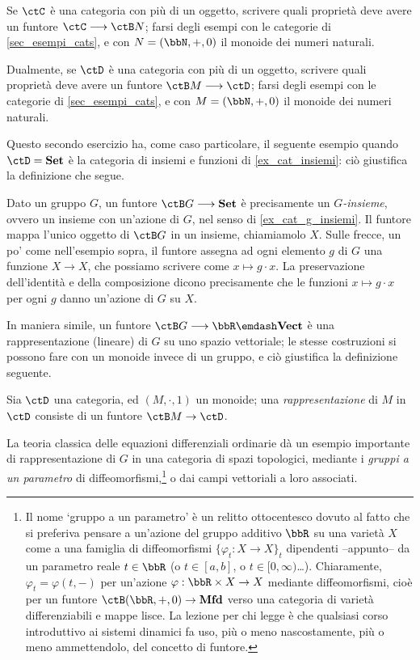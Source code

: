 Se \(\ctC\) è una categoria con più di un oggetto, scrivere quali proprietà deve avere un funtore \(\ctC \fun \ctB N\); farsi degli esempi con le categorie di \ref{sec_esempi_cats}, e con \(N=(\bbN,+,0)\) il monoide dei numeri naturali.

Dualmente, se \(\ctD\) è una categoria con più di un oggetto, scrivere quali proprietà deve avere un funtore \(\ctB M \fun \ctD\); farsi degli esempi con le categorie di \ref{sec_esempi_cats}, e con \(M = (\bbN,+,0)\) il monoide dei numeri naturali.

Questo secondo esercizio ha, come caso particolare, il seguente esempio quando \(\ctD=\ctSet\) è la categoria di insiemi e funzioni di \ref{ex_cat_insiemi}: ciò giustifica la definizione che segue.
\begin{example}\label{exa_azioni_funtori}
	Dato un gruppo \(G\), un funtore \(\ctB G\fun\ctSet\) è precisamente un \emph{\(G\)-insieme}, ovvero un insieme con un'azione di \(G\), nel senso di \ref{ex_cat_g_insiemi}.
	Il funtore mappa l'unico oggetto di \(\ctB G\) in un insieme, chiamiamolo \(X\).
	Sulle frecce, un po' come nell'esempio sopra, il funtore assegna ad ogni elemento \(g\) di \(G\) una funzione \(X\to X\), che possiamo scrivere come \(x\mapsto g\cdot x\).
	La preservazione dell'identità e della composizione dicono precisamente che le funzioni \(x\mapsto g\cdot x\) per ogni \(g\) danno un'azione di \(G\) su \(X\).

\end{example}
In maniera simile, un funtore \(\ctB G\fun\bbR\emdash\ctVect\) è una rappresentazione (lineare) di \(G\) su uno spazio vettoriale; le stesse costruzioni si possono fare con un monoide invece di un gruppo, e ciò giustifica la definizione seguente.
\begin{definition}[Rappresentazione di \(M\)]
	Sia \(\ctD\) una categoria, ed \((M,\cdot,1)\) un monoide; una \emph{rappresentazione} di \(M\) in \(\ctD\) consiste di un funtore \(\ctB M \to \ctD\).
\end{definition}
La teoria classica delle equazioni differenziali ordinarie dà un esempio importante di rappresentazione di \(G\) in una categoria di spazi topologici, mediante i \emph{gruppi a un parametro} di diffeomorfismi,\footnote{Il nome `gruppo a un parametro' è un relitto ottocentesco dovuto al fatto che si preferiva pensare a un'azione del gruppo additivo \(\bbR\) su una varietà \(X\) come a una famiglia di diffeomorfismi \(\{\varphi_t : X\to X\}_t\) dipendenti --appunto-- da un parametro reale \(t\in\bbR\) (o \(t\in [a,b]\), o \(t\in [0,\infty)\)\dots). Chiaramente, \(\varphi_t = \varphi(t,-)\) per un'azione \(\varphi : \bbR\times X\to X\) mediante diffeomorfismi, cioè per un funtore \(\ctB(\bbR,+,0)\to\cate{Mfd}\) verso una categoria di varietà differenziabili e mappe lisce. La lezione per chi legge è che qualsiasi corso introduttivo ai sistemi dinamici fa uso, più o meno nascostamente, più o meno ammettendolo, del concetto di funtore.} o dai campi vettoriali a loro associati.
